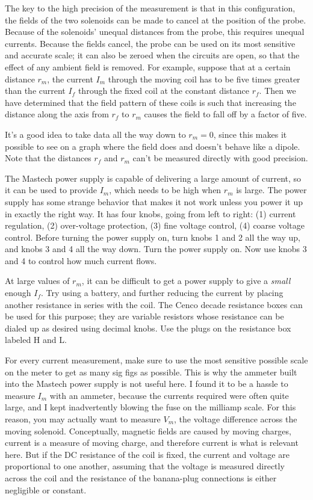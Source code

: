 The key to the high precision of the measurement is that in this configuration, the
fields of the two solenoids can be made to cancel at the position of the probe. Because
of the solenoids' unequal distances from the probe, this requires unequal currents.
Because the fields cancel, the probe can be used on its most sensitive and accurate
scale; it can also be zeroed when the circuits are open, so that the effect of any
ambient field is removed. For example, suppose that at a certain distance $r_m$,
the current $I_m$ through the moving coil has to be five times greater than the current
$I_f$ through the fixed coil at the constant distance $r_f$. Then we have determined that
the field pattern of these coils is such that increasing the distance along the axis
from $r_f$ to $r_m$ causes the field to fall off by a factor of five.

It's a good idea to take data all the way down to $r_m=0$, since this makes it possible
to see on a graph where the field does and doesn't behave like a dipole. Note that the
distances $r_f$ and $r_m$ can't be measured directly with good precision.

The Mastech power supply is capable of delivering a large amount of current, so it can
be used to provide $I_m$, which needs to be high when $r_m$ is large.
The power supply has some strange behavior that makes it not work unless
you power it up in exactly the right way. It has four knobs, going from
left to right: (1) current regulation, (2) over-voltage protection, (3)
fine voltage control, (4) coarse voltage control. Before turning the power
supply on, turn knobs 1 and 2 all the way up, and knobs 3 and 4 all the way
down. Turn the power supply on. Now use knobs 3 and 4 to control how much
current flows.

At large values of $r_m$, it can be difficult to get a power supply
to give a \emph{small} enough $I_f$. Try using a battery, and further reducing
the current by placing another resistance in series with the coil. The Cenco
decade resistance boxes can be used for this purpose; they are variable resistors
whose resistance can be dialed up as desired using decimal knobs. Use the plugs
on the resistance box labeled H and L.

For every current measurement, make sure to use the most sensitive possible scale
on the meter to get as many sig figs as possible. This is why the ammeter built into
the Mastech power supply is not useful here.
I found it to be a hassle to measure $I_m$ with an ammeter, because the currents
required were often quite large, and I kept inadvertently blowing the fuse on
the milliamp scale. For this reason, you may actually want to measure $V_m$, the
voltage difference across the moving solenoid. Conceptually, magnetic fields
are caused by moving charges, current is a measure of moving charge, and therefore
current is what is relevant here. But if the DC resistance of the coil is
fixed, the current and voltage are proportional to one another, assuming that the
voltage is measured directly across the coil and the resistance of the banana-plug
connections is either negligible or constant.

